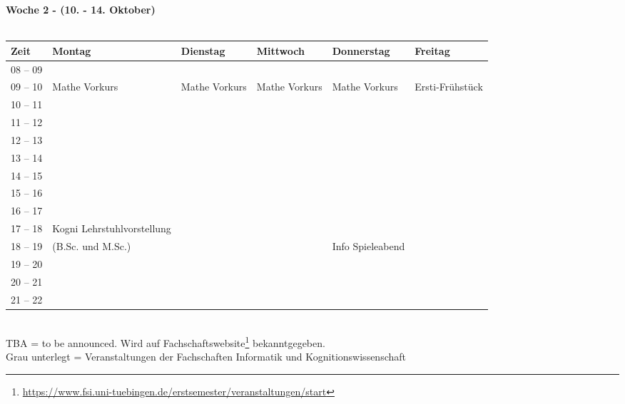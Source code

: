 \textbf{Woche 2 - (10. - 14. Oktober)}\\
\\
\begin{tabular}{|l|p{}|p{}|p{}|p{}|p{}|} \hline
 Zeit & Montag & Dienstag & Mittwoch & Donnerstag & Freitag \\ \hline \hline
 08 -- 09 & & & & & \\ \cline{1-5}
 09 -- 10 & \footnotesize{Mathe Vorkurs} & \footnotesize{Mathe Vorkurs} & \footnotesize{Mathe Vorkurs} & \footnotesize{Mathe Vorkurs} & \scriptsize{Ersti-Frühstück}\cellcolor{lightlightgray} \\ \cline{1-1}
 10 -- 11 & & & & &\cellcolor{lightlightgray} \\ \cline{1-1}
 11 -- 12 & & & & & \\ \cline{1-1}
 12 -- 13 & & & & & \\ \cline{1-1}
 13 -- 14 & & & & & \\ \cline{1-1}
 14 -- 15 & & & & & \\ \cline{1-1}
 15 -- 16 & & & & & \\ \cline {1-5}
 16 -- 17 & & & & & \\ \cline{1-1}
 17 -- 18 & \scriptsize{Kogni Lehr\-stuhl\-vor\-stell\-ung} & & & & \\ \cline{1-1}
 18 -- 19 &\scriptsize{(B.Sc. und M.Sc.)} & & & \scriptsize{Info Spieleabend} \cellcolor{lightlightgray}& \\ \cline{1-1}
 19 -- 20 &  & & &  \cellcolor{lightlightgray}& \\ \cline{1-1}
 20 -- 21 & & &  & \cellcolor{lightlightgray}&  \\ \cline{1-1}
 21 -- 22 &  & &  & \cellcolor{lightlightgray}& \\ \hline
\end{tabular}
\\
\scriptsize{TBA = to be announced. Wird auf Fachschaftswebsite\footnote{\url{https://www.fsi.uni-tuebingen.de/erstsemester/veranstaltungen/start}}  bekanntgegeben.} \\
\scriptsize{Grau unterlegt = Veranstaltungen der Fachschaften Informatik und Kognitionswissenschaft }
\newpage


